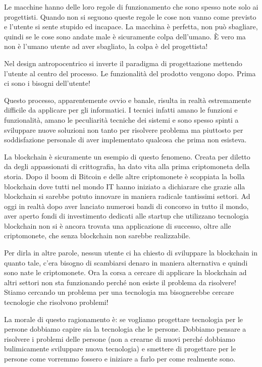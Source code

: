 Le macchine hanno delle loro regole di funzionamento che sono spesso note solo ai progettisti. Quando non si seguono queste regole le cose non vanno
come previsto e l'utente si sente stupido ed incapace. La macchina è perfetta, non può sbagliare, quindi se le cose sono andate male è sicuramente colpa
dell'umano. \`E vero ma non è l'umano utente ad aver sbagliato, la colpa è del progettista!

Nel design antropocentrico si inverte il paradigma di progettazione mettendo l'utente al centro del processo. Le funzionalità del prodotto vengono dopo.
Prima ci sono i bisogni dell'utente!

Questo processo, apparentemente ovvio e banale, risulta in realtà estremamente difficile da applicare per gli informatici. I tecnici infatti amano le
funzioni e funzionalità, amano le peculiarità tecniche dei sistemi e sono spesso spinti a sviluppare nuove soluzioni non tanto per risolvere problema
ma piuttosto per soddisfazione personale di aver implementato qualcosa che prima non esisteva.

La blockchain è sicuramente un esempio di questo fenomeno. Creata per diletto da degli appassionati di crittografia, ha dato vita alla prima criptomoneta
della storia. Dopo il boom di Bitcoin e delle altre criptomonete è scoppiata la bolla blockchain dove tutti nel mondo IT hanno iniziato a dichiarare
che grazie alla blockchain si sarebbe potuto innovare in maniera radicale tantissimi settori. Ad oggi in realtà dopo aver lanciato numerosi bandi
di concorso in tutto il mondo, aver aperto fondi di investimento dedicati alle startup che utilizzano tecnologia blockchain non si è ancora trovata una
applicazione di successo, oltre alle criptomonete, che senza blockchain non sarebbe realizzabile.

Per dirla in altre parole, nessun utente ci ha chiesto di sviluppare la blockchain in quanto tale, c'era bisogno di scambiarsi denaro in maniera
alternativa e quindi sono nate le criptomonete. Ora la corsa a cercare di applicare la blockchain ad altri settori non sta funzionando perché non
esiste il problema da risolvere! Stiamo cercando un problema per una tecnologia ma bisognerebbe cercare tecnologie che risolvono problemi!

La morale di questo ragionamento è: se vogliamo progettare tecnologia per le persone dobbiamo capire sia la tecnologia che le persone. Dobbiamo
pensare a risolvere i problemi delle persone (non a crearne di nuovi perché dobbiamo bulimicamente sviluppare nuova tecnologia) e smettere di progettare
per le persone come vorremmo fossero e iniziare a farlo per come realmente sono.


